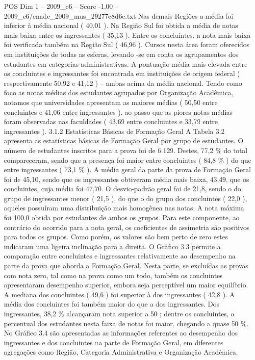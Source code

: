 \begin{textsample}{POS Dim 1 – 2009\_c6 – Score -1.00 – 2009\_c6/enade\_2009\_mus\_29277e8d6e.txt}
Nas demais Regiões a média foi inferior à média nacional ( 40,01 ).
Na Região Sul foi obtida a média de notas mais baixa entre os ingressantes ( 35,13 ).
Entre os concluintes, a nota mais baixa foi verificada também na Região Sul ( 46,96 ).
Cursos nesta área foram oferecidos em instituições de todas as esferas, levando -se em conta os agrupamentos dos estudantes em categorias administrativas.
A pontuação média mais elevada entre os concluintes e ingressantes foi encontrada em instituições de origem federal ( respectivamente 50,92 e 41,12 ) – ambas acima da média nacional.
Tendo como foco as notas médias dos estudantes agrupados por Organização Acadêmica, notamos que universidades apresentam as maiores médias ( 50,50 entre concluintes e 41,06 entre ingressantes ), ao passo que as piores notas médias foram observadas nas faculdades ( 43,69 entre concluintes e 33,79 entre ingressantes ). 3.1.2 Estatísticas Básicas de Formação Geral A Tabela 3.2 apresenta as estatísticas básicas de Formação Geral por grupo de estudantes.
O número de estudantes inscritos para a prova foi de 6.129.
Destes, 77,2 \% do total compareceram, sendo que a presença foi maior entre concluintes ( 84,8 \% ) do que entre ingressantes ( 73,1 \% ).
A média geral da parte da prova de Formação Geral foi de 45,10, sendo que os ingressantes obtiveram média mais baixa, 43,49, que os concluintes, cuja média foi 47,70.
O desvio-padrão geral foi de 21,8, sendo o do grupo de ingressantes menor ( 21,5 ), do que o do grupo dos concluintes ( 22,0 ), aqueles possuíram uma distribuição mais homogênea nas notas.
A nota máxima foi 100,0 obtida por estudantes de ambos os grupos.
Para este componente, ao contrário do ocorrido para a nota geral, os coeficientes de assimetria são positivos para todos os grupos.
Como porém, os valores são bem perto de zero estes indicaram uma ligeira inclinação para a direita.
O Gráfico 3.3 permite a comparação entre concluintes e ingressantes relativamente ao desempenho na parte da prova que aborda a Formação Geral.
Nesta parte, se excluídas as provas com nota zero, tal como na prova como um todo, também os concluintes apresentaram desempenho superior, embora seja perceptível um maior equilíbrio.
A mediana dos concluintes ( 49,6 ) foi superior à dos ingressantes ( 42,8 ).
A média dos concluintes foi também maior do que a dos ingressantes.
Dos ingressantes, 38,2 \% alcançaram nota superior a 50 ; dentre os concluintes, o percentual dos estudantes nesta faixa de notas foi maior, chegando a quase 50 \%.
No Gráfico 3.4 são apresentadas as informações referentes ao desempenho dos ingressantes e dos concluintes na parte de Formação Geral, em diferentes agregações como Região, Categoria Administrativa e Organização Acadêmica.

\end{textsample}
